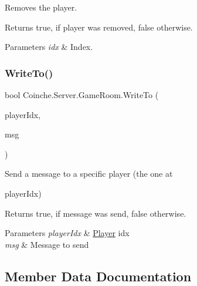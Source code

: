 Removes the player. 

\begin{DoxyReturn}{Returns}
{\ttfamily true}, if player was removed, {\ttfamily false} otherwise.
\end{DoxyReturn}

\begin{DoxyParams}{Parameters}
{\em idx} & Index.\\
\hline
\end{DoxyParams}
\mbox{\label{class_coinche_1_1_server_1_1_game_room_a04af07a82fdb50bc44286ff13821c415}} 
\subsubsection{\texorpdfstring{Write\+To()}{WriteTo()}}
{\footnotesize\ttfamily bool Coinche.\+Server.\+Game\+Room.\+Write\+To (\begin{DoxyParamCaption}\item[{int}]{player\+Idx,  }\item[{\hyperlink{class_coinche_1_1_google_1_1_protobuf_1_1_game_response}{Game\+Response}}]{msg }\end{DoxyParamCaption})\hspace{0.3cm}{\ttfamily [inline]}}



Send a message to a specific player (the one at 

{\ttfamily player\+Idx}) \begin{DoxyReturn}{Returns}
{\ttfamily true}, if message was send, {\ttfamily false} otherwise.
\end{DoxyReturn}

\begin{DoxyParams}{Parameters}
{\em player\+Idx} & \hyperlink{class_coinche_1_1_player}{Player} idx\\
\hline
{\em msg} & Message to send\\
\hline
\end{DoxyParams}


\subsection{Member Data Documentation}
\mbox{\label{class_coinche_1_1_server_1_1_game_room_ae56bde4084308813042760d8d816d503}} 
